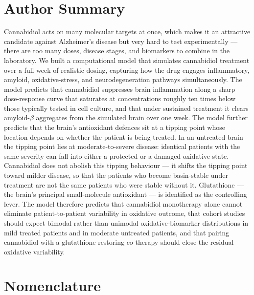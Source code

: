 \documentclass[10pt,letterpaper]{article}
\begin{document}
\section*{Author Summary}

Cannabidiol acts on many molecular targets at once, which makes it an attractive candidate against Alzheimer's disease but very hard to test experimentally --- there are too many doses, disease stages, and biomarkers to combine in the laboratory. We built a computational model that simulates cannabidiol treatment over a full week of realistic dosing, capturing how the drug engages inflammatory, amyloid, oxidative-stress, and neurodegeneration pathways simultaneously. The model predicts that cannabidiol suppresses brain inflammation along a sharp dose-response curve that saturates at concentrations roughly ten times below those typically tested in cell culture, and that under sustained treatment it clears amyloid-$\beta$ aggregates from the simulated brain over one week. The model further predicts that the brain's antioxidant defences sit at a tipping point whose location depends on whether the patient is being treated. In an untreated brain the tipping point lies at moderate-to-severe disease: identical patients with the same severity can fall into either a protected or a damaged oxidative state. Cannabidiol does not abolish this tipping behaviour --- it shifts the tipping point toward milder disease, so that the patients who become basin-stable under treatment are not the same patients who were stable without it. Glutathione --- the brain's principal small-molecule antioxidant --- is identified as the controlling lever. The model therefore predicts that cannabidiol monotherapy alone cannot eliminate patient-to-patient variability in oxidative outcome, that cohort studies should expect bimodal rather than unimodal oxidative-biomarker distributions in mild treated patients and in moderate untreated patients, and that pairing cannabidiol with a glutathione-restoring co-therapy should close the residual oxidative variability.

\linenumbers

\section*{Nomenclature}
\end{document}
